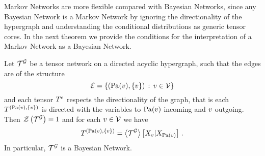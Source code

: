 
Markov Networks are more flexible compared with Bayesian Networks, since any Bayesian Network is a Markov Network by ignoring the directionality of the hypergraph and understanding the conditional distributions as generic tensor cores.
In the next theorem we provide the conditions for the interpretation of a Markov Network as a Bayesian Network.

\begin{theorem}
    \label{the:MarkovToBayesian}
    Let $\mathcal{T}^{\mathcal{G}}$ be a tensor network on a directed acyclic hypergraph, such that the edges are of the structure
    \[ \mathcal{E} = \{(\mathrm{Pa}(v),\{v\}) \, : \, v\in\mathcal{V}\} \]
    and each tensor $T^{e}$ respects the directionality of the graph, that is each $T^{(\mathrm{Pa}(v), \{v\})}$ is directed with the variables to $\mathrm{Pa}(v)$ incoming and $v$ outgoing.
    Then $\mathcal{Z}\left(\mathcal{T}^{\mathcal{G}}\right)=1$ and for each $v\in\mathcal{V}$ we have
    \[ T^{(\mathrm{Pa}(v),\{v\})} = \left\langle \mathcal{T}^{\mathcal{G}}\right\rangle \left[ X_{v} | X_{\mathrm{Pa}(v)} \right] \, . \]
    In particular, $\mathcal{T}^{\mathcal{G}}$ is a Bayesian Network.
\end{theorem}
